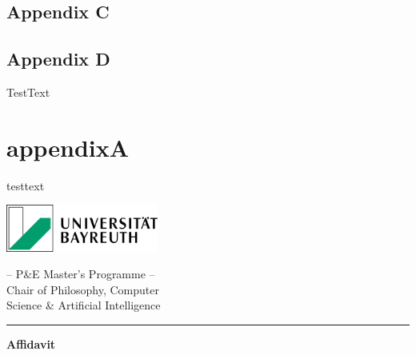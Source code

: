\documentclass[
  letterpaper,
]{book}
\begin{document}
\section{Appendix C}\label{appendix-c}

\section{Appendix D}\label{appendix-d}

TestText

\chapter{appendixA}\label{appendixa}

testtext


\backmatter


\clearpage
\thispagestyle{empty} %

\newpage


\begin{minipage}{0.3\textwidth}
  \includegraphics[width=5cm]{latex/uni-bayreuth-logo.png}
\end{minipage}
\hfill
\begin{minipage}{0.9\textwidth}
  \begin{center}
    -- P\&E Master's Programme --\\
    Chair of Philosophy, Computer\\
    Science \& Artificial Intelligence
  \end{center}
\end{minipage}

\vspace{1.5cm}
\hrule
\vspace{2.5cm}


  \LARGE\textbf{Affidavit}
\vspace{1.5cm}

\center

\normalsize

\end{document}
